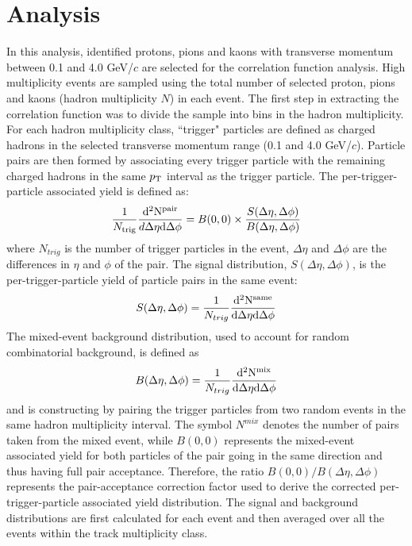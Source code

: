 \documentclass[aps,prl,twocolumn,showpacs,superscriptaddress,groupedaddress]{revtex4}  %
\begin{document}
\section{\label{sec:analysis}Analysis}
In this analysis, identified protons, pions and kaons with transverse momentum between 0.1 and 4.0 GeV/$c$ 
are selected for the correlation function analysis. High multiplicity events are sampled using the total number of selected proton, 
pions and kaons (hadron multiplicity $N$) in each event. The first step in extracting the correlation function was to divide the sample 
into bins in the hadron multiplicity. For each hadron multiplicity class, ``trigger" particles are defined as charged hadrons in the selected transverse momentum range (0.1 and 4.0 GeV/$c$). Particle pairs are then formed by associating every trigger particle with the remaining charged hadrons in the same $p_{\rm T}$ interval as the trigger particle. The per-trigger-particle associated yield is defined as:
\begin{eqnarray}
\label{eq:associatedyield}
\frac{1}{N_{\rm trig}}\frac{\rm d^2N^{pair}}{d\Delta\eta  \rm d\Delta\phi}= B(0,0) \times \frac{S(\Delta\eta, \Delta\phi)}{B(\Delta\eta, \Delta\phi)}
\end{eqnarray}
where $N_{trig}$ is the number of trigger particles in the event, $\Delta\eta$ and $\Delta\phi$ are the differences in $\eta$ and $\phi$ of the pair. The signal distribution, $S(\Delta\eta, \Delta\phi)$, 
is the per-trigger-particle yield of particle pairs in the same event: 
\begin{eqnarray}
\label{eq:S}
S(\Delta\eta,\Delta\phi) = \frac{1}{N_{trig}}\frac{\rm d^2 N^{\rm same}}{\rm d\Delta\eta \rm d\Delta\phi}
\end{eqnarray}
The mixed-event background distribution, used to account for random combinatorial background, is defined as 
\begin{eqnarray}
\label{eq:B}
B(\Delta\eta,\Delta\phi) = \frac{1}{N_{trig}}\frac{\rm d^2 N^{\rm mix}}{\rm d\Delta\eta \rm d\Delta\phi}
\end{eqnarray}
and is constructing by pairing the trigger particles from two random events in the same hadron multiplicity interval.
The symbol $N^{mix}$ denotes the number of pairs taken from the mixed event, while $B(0,0)$ represents the mixed-event associated yield for both particles of the pair going in the same direction and thus having full pair acceptance. Therefore, 
the ratio $B(0,0)/B(\Delta\eta,\Delta\phi)$ represents the pair-acceptance correction factor used to derive the corrected per-trigger-particle
associated yield distribution.  The signal and background distributions are first calculated for each event and then averaged over all the events within the track multiplicity class. 
\end{document}

